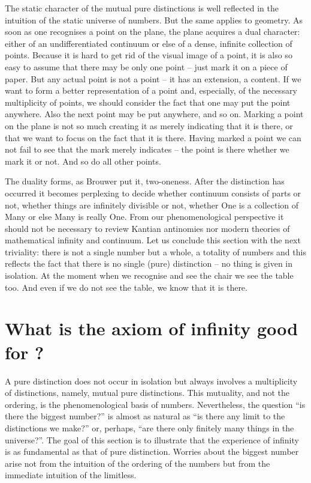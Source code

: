 The static character of the mutual pure distinctions is well reflected in the intuition of the static universe of numbers. But the same applies to geometry. As soon as one recognises a point on the plane, the plane acquires a dual character: either of an undifferentiated continuum or else of a dense, infinite collection of points. Because it is hard to get rid of the visual image of a point, it is also so easy to assume that there may be only one point -- just mark it on a piece of paper. But any actual point is not a point -- it has an extension, a content. If we want to form a better representation of a point and, especially, of the necessary multiplicity of points, we should consider the fact that one may put the point anywhere. Also the next point may be put anywhere, and so on. Marking a point on the plane is not so much creating it as merely indicating that it is there, or that we want to focus on the fact that it is there. Having marked a point we can not fail to see that the mark merely indicates -- the point is there whether we mark it or not. And so do all other points.

The duality forms, as Brouwer put it, two-oneness. After the distinction has occurred it becomes perplexing to decide whether continuum consists of parts or not, whether things are infinitely divisible or not, whether One is a collection of Many or else Many is really One. From our phenomenological perspective it should not be necessary to review Kantian antinomies nor modern theories of mathematical infinity and continuum. Let us conclude this section with the next triviality: there is not a single number but a whole, a totality of numbers and this reflects the fact that there is no single (pure) distinction -- no thing is given in isolation. At the moment when we recognise and see the chair we see the table too. And even if we do not see the table, we know that it is there. 

\section{What is the axiom of infinity good for ?}\label{se:infinity}
A pure distinction does not occur in isolation but always involves a multiplicity of distinctions, namely, mutual pure distinctions. This mutuality, and not the ordering, is the phenomenological basis of numbers. Nevertheless, the question ``is there the biggest number?'' is almost as natural as ``is there any limit to the distinctions we make?'' or, perhaps, ``are there only finitely many things in the universe?''. The goal of this section is to illustrate that the experience of infinity is as fundamental as that of pure distinction. Worries about the biggest number arise not from the intuition of the ordering of the numbers but from the immediate intuition of the limitless.

